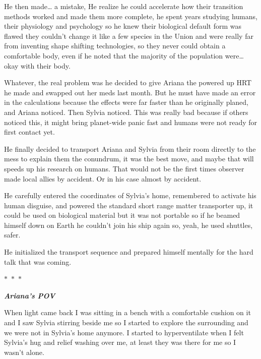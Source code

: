 \documentclass[hidelinks,12pt,a4paper]{book}
\newcommand\sep{\begin{center}
  $\ast$~$\ast$~$\ast$
\end{center}}
\begin{document}
He then made… a mistake, He realize he could accelerate how their transition methods worked and 
made them more complete, he spent years studying humans, their physiology and psychology so he knew their 
biological default form was flawed they couldn't change it like a few species in the Union and were really far 
from inventing shape shifting technologies, so they never could obtain a comfortable body, even if he noted
 that the majority of the population were… okay with their body. \par
 \bigskip

Whatever, the real problem was he decided to give Ariana the powered up HRT he made and 
swapped out her meds last month. But he must have made an error in the calculations because the effects 
were far faster than he originally planed, and Ariana noticed. Then Sylvia noticed. This was really bad
 because if others noticed this, it might bring planet-wide panic fast and humans were not ready for first contact yet.\par
 \bigskip

He finally decided to transport Ariana and Sylvia from their room directly to the mess to explain them the conundrum, 
it was the best move, and maybe that will speeds up his research on humans. That would not be the first times 
observer made local allies by accident. Or in his case almost by accident. \par
\bigskip

He carefully entered the coordinates of Sylvia's home, remembered to activate his human disguise, 
and powered the standard short range matter transporter up, it could be used on biological material
 but it was not portable so if he beamed himself down on Earth he couldn't join his ship again so, yeah, he used shuttles,
  safer.\par
  \bigskip

He initialized the transport sequence and prepared himself mentally for the hard talk that was coming.

\sep

\textit{\textbf{Ariana's POV}}

When light came back I was sitting in a bench with a comfortable cushion on it and I saw Sylvia stirring 
beside me so I started to explore the surrounding and we were not in Sylvia's home anymore. 
I started to hyperventilate when I felt Sylvia's hug and relief washing over me, at least they was there for me so 
I wasn't alone.\par
\bigskip
\end{document}
